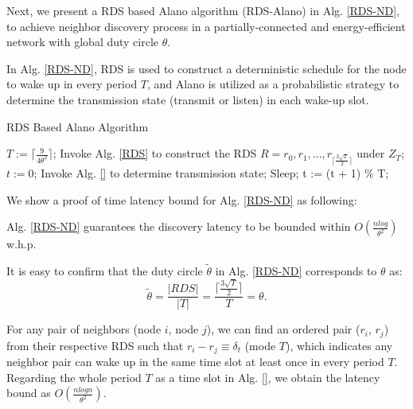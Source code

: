 
Next, we present a RDS based Alano algorithm (RDS-Alano) in Alg. \ref{RDS-ND},
to achieve neighbor discovery process in a partially-connected
and energy-efficient network with global duty circle $\theta$. 

In Alg. \ref{RDS-ND}, RDS is used to construct a deterministic 
schedule for the node to wake up in every period $T$, 
and Alano is utilized as a probabilistic strategy to 
determine the transmission state (transmit or listen)
in each wake-up slot.

\begin{algorithm}
\caption{RDS Based Alano Algorithm}
\label{RDS-ND}
\begin{algorithmic}[1]
\STATE $T := \lceil \frac{9}{4\theta^{2}} \rceil$;
\STATE Invoke Alg. \ref{RDS} to construct the RDS $R = {r_0, r_1, ...,r_{\lceil \frac{3\sqrt{T}}{2}  \rceil}}$ under $Z_T$;
\STATE $t := 0$;
    		\STATE Invoke Alg. \ref{} to determine transmission state;
	\ELSE
    		\STATE Sleep;
	\ENDIF
	\STATE t := (t + 1) \% T;
\ENDWHILE
\end{algorithmic}
\end{algorithm}


We show a proof of time latency bound for Alg. \ref{RDS-ND}  as following:

\begin{theorem}
\label{theoremRDS}
Alg. \ref{RDS-ND} guarantees the discovery latency
to be bounded within $O(\frac{nlog}{\theta^2})$ w.h.p.
\end{theorem}

\begin{IEEEproof}
It is easy to confirm that the duty circle $\widetilde{\theta}$ in Alg. \ref{RDS-ND} corresponds to $\theta$ as:
$$
\widetilde{\theta} = \frac{|RDS|}{|T|} = \frac{\lceil \frac{3\sqrt{T}}{2}  \rceil}{T} = \theta.
$$

For any pair of neighbors (node $i$, node $j$), 
we can find an ordered pair ($r_i$, $r_j$) from their respective RDS
such that $r_i - r_j \equiv \delta_t$ (mode $T$), 
which indicates any neighbor pair can wake up
in the same time slot at least once in every period $T$. 
Regarding the whole period $T$ as a time
slot in Alg. \ref{}, we obtain the latency bound as $O(\frac{nlogn}{\theta^2})$.


\end{IEEEproof}

